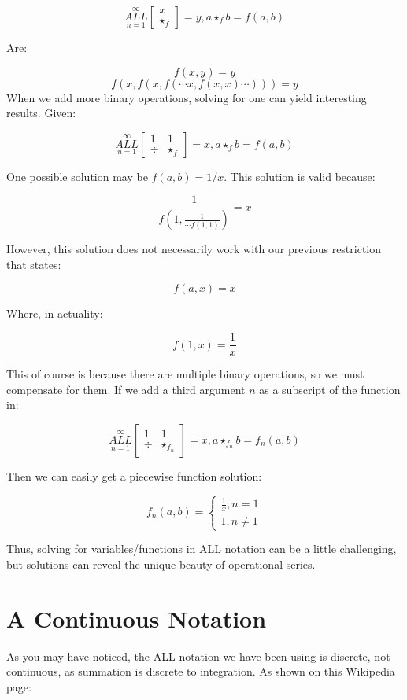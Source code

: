 \documentclass{article}
\begin{document}
$$\underset{n=1}{\overset{\infty}{ALL}} \begin{bmatrix}
x \\
\star_f
\end{bmatrix} = y, a \star_f b = f(a,b)$$

Are:

$$f(x,y)=y$$
$$f(x,f(x,f(\cdots x,f(x,x) \cdots ))) = y$$
When we add more binary operations, solving for one can yield interesting results. Given:

$$\underset{n=1}{\overset{\infty}{ALL}} \begin{bmatrix}
1 & 1 \\
\div & \star_f
\end{bmatrix} = x, a \star_f b = f(a,b)$$

One possible solution may be $f(a,b)=1/x$. This solution is valid because:

$$\frac{1}{f(1,\frac{1}{\cdots f(1,1)})}=x$$

However, this solution does not necessarily work with our previous restriction that states:

$$f(a,x)=x$$

Where, in actuality:

$$f(1,x)=\frac{1}{x}$$

This of course is because there are multiple binary operations, so we must compensate for them. If we add a third argument $n$ as a subscript of the function in:

$$\underset{n=1}{\overset{\infty}{ALL}} \begin{bmatrix}
1 & 1 \\
\div & \star_{f_n}
\end{bmatrix} = x, a \star_{f_n} b = f_n(a,b)$$

Then we can easily get a piecewise function solution:

$$f_n(a,b) = \left\{ \begin{array}{rcl}
\frac{1}{x}, n=1 \\ 1, n \neq 1 \end{array}\right.
$$

Thus, solving for variables/functions in ALL notation can be a little challenging, but solutions can reveal the unique beauty of operational series.

\section{A Continuous Notation}

As you may have noticed, the ALL notation we have been using is discrete, not continuous, as summation is discrete to integration. As shown on this Wikipedia page:
\end{document}
